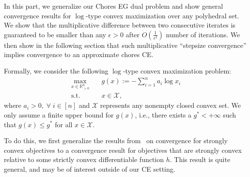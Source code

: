\documentclass[format=acmsmall,authorversion]{acmart}
\newcommand{\R}{\mathbb{R}}
\newcommand{\ntl}[1]{{\textcolor{teal}{Tianlong: #1}}}
\newcommand{\notename}[2]{{\textcolor{blue}{\footnotesize{\bf (#1:} {#2}{\bf ) }}}}
\newcommand{\RM}[1]{{\notename{RM}{#1}}}
\begin{document}

In this part, we generalize our Chores EG dual problem and show general convergence results for $\log$-type convex maximization over any polyhedral set. 
We show that the multiplicative difference between two consecutive iterates is guaranteed to be smaller than any $\epsilon>0$ after $O(\frac{1}{\epsilon^2})$ number of iterations. 
We then show in the following section that such multiplicative ``stepsize convergence'' implies convergence to an approximate chores CE.

Formally, we consider the following $\log$-type convex maximization problem:
\begin{equation}
    \begin{aligned}
        \max_{x \in \R^n_{>0}} \quad & g(x) := -\sum_{i=1}^n a_i \log{x_i} \\ 
        \mbox{s.t.} \quad & x \in \mathcal{X},
    \end{aligned}
    \label{eq:log-type-convex-max-prob}
\end{equation}
where $a_i > 0, \; \forall\; i \in [n]$ and $\mathcal{X}$ represents any nonempty closed convex set. We only assume a finite upper bound for $g(x)$, i.e., there exists a $g^* < +\infty$ such that $g(x) \leq g^*$ for all $x \in \mathcal{X}$. 

To do this, we first generalize the results from~\citet{journee2010generalized} on convergence for strongly convex objectives to a convergence result for objectives that are strongly convex relative to some strictly convex differentiable function $h$.
This result is quite general, and may be of interest outside of our CE setting.
\end{document}
